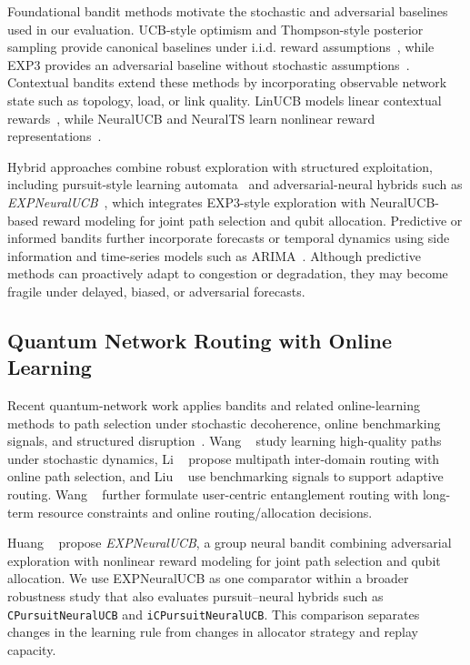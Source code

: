 Foundational bandit methods motivate the stochastic and adversarial baselines used in our evaluation. UCB-style optimism and Thompson-style posterior sampling provide canonical baselines under i.i.d. reward assumptions~\cite{auer2002finite,thompson1933likelihood}, while EXP3 provides an adversarial baseline without stochastic assumptions~\cite{auer2002nonstochastic}. Contextual bandits extend these methods by incorporating observable network state such as topology, load, or link quality. LinUCB models linear contextual rewards~\cite{li2010contextual}, while NeuralUCB and NeuralTS learn nonlinear reward representations~\cite{zhou2020neuralucb,zhang2022neuralts}.

Hybrid approaches combine robust exploration with structured exploitation, including pursuit-style learning automata~\cite{thathachar2011networks} and adversarial-neural hybrids such as \emph{EXPNeuralUCB}~\cite{huang2024quantum}, which integrates EXP3-style exploration with NeuralUCB-based reward modeling for joint path selection and qubit allocation. Predictive or informed bandits further incorporate forecasts or temporal dynamics using side information and time-series models such as ARIMA~\cite{kar2024icmab,box2015time}. Although predictive methods can proactively adapt to congestion or degradation, they may become fragile under delayed, biased, or adversarial forecasts.

\subsection{Quantum Network Routing with Online Learning}

Recent quantum-network work applies bandits and related online-learning methods to path selection under stochastic decoherence, online benchmarking signals, and structured disruption~\cite{wehner2018quantum,huang2024quantum,wang2025learning,li2025multipath,liu2024qbgp}. Wang \etal~\cite{wang2025learning} study learning high-quality paths under stochastic dynamics, Li \etal~\cite{li2025multipath} propose multipath inter-domain routing with online path selection, and Liu \etal~\cite{liu2024qbgp} use benchmarking signals to support adaptive routing. Wang \etal~\cite{wang2024adaptive} further formulate user-centric entanglement routing with long-term resource constraints and online routing/allocation decisions.

Huang \etal~\cite{huang2024quantum} propose \emph{EXPNeuralUCB}, a group neural bandit combining adversarial exploration with nonlinear reward modeling for joint path selection and qubit allocation. We use EXPNeuralUCB as one comparator within a broader robustness study that also evaluates pursuit--neural hybrids such as \texttt{CPursuitNeuralUCB} and \texttt{iCPursuitNeuralUCB}. This comparison separates changes in the learning rule from changes in allocator strategy and replay capacity.

